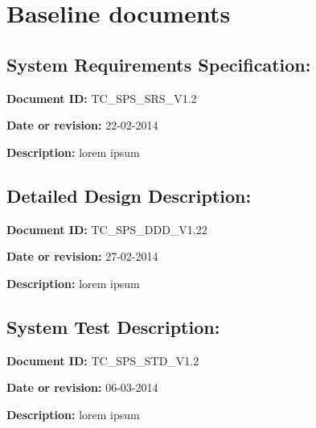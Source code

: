\documentclass[Main]{subfiles}
\begin{document}
\chapter{Baseline documents}
\section{System Requirements Specification:}

\textbf{Document ID:}
TC\_SPS\_SRS\_V1.2

\textbf{Date or revision:}
22-02-2014

\textbf{Description:}
lorem ipsum


\section{Detailed Design Description:}
\textbf{Document ID:} 
TC\_SPS\_DDD\_V1.22

\textbf{Date or revision:}
27-02-2014

\textbf{Description:}
lorem ipsum

\section{System Test Description:}
\textbf{Document ID: }
TC\_SPS\_STD\_V1.2

\textbf{Date or revision:}
06-03-2014

\textbf{Description:}
lorem ipsum
\end{document}
